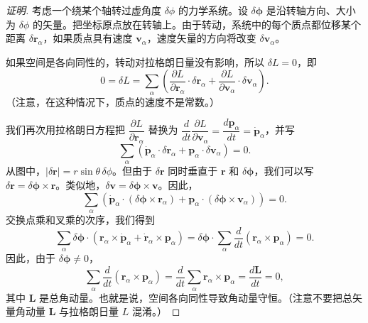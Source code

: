 \begin{proof}[证明]
考虑一个绕某个轴转过虚角度 $\delta\phi$ 的力学系统。设 $\delta\bm{\phi}$ 是沿转轴方向、大小为 $\delta\phi$ 的矢量。把坐标原点放在转轴上。由于转动，系统中的每个质点都位移某个距离 $\delta\mathbf{r}_\alpha$，如果质点具有速度 $\mathbf{v}_\alpha$，速度矢量的方向将改变 $\delta\mathbf{v}_\alpha$。

如果空间是各向同性的，转动对拉格朗日量没有影响，所以 $\delta L = 0$，即
\begin{equation}\label{eq:1.dL2}
0 = \delta L = \sum_{\alpha}\left(\frac{\partial L}{\partial \mathbf{r}_\alpha}\cdot\delta\mathbf{r}_\alpha + \frac{\partial L}{\partial \mathbf{v}_\alpha}\cdot\delta\mathbf{v}_\alpha\right).
\end{equation}
（注意，在这种情况下，质点的速度不是常数。）

我们再次用拉格朗日方程把 $\dfrac{\partial L}{\partial \mathbf{r}_\alpha}$ 替换为 $\dfrac{d}{dt}\dfrac{\partial L}{\partial \mathbf{v}_\alpha} = \dfrac{d\mathbf{p}_\alpha}{dt} = \dot{\mathbf{p}}_\alpha$，并写
\begin{equation}\label{eq:1.ang1}
\sum_{\alpha}\left(\dot{\mathbf{p}}_\alpha\cdot\delta\mathbf{r}_\alpha + \mathbf{p}_\alpha\cdot\delta\mathbf{v}_\alpha\right) = 0.
\end{equation}
从图中，$|\delta\mathbf{r}| = r\sin\theta\,\delta\phi$。但由于 $\delta\mathbf{r}$ 同时垂直于 $\mathbf{r}$ 和 $\delta\bm{\phi}$，我们可以写 $\delta\mathbf{r} = \delta\bm{\phi}\times\mathbf{r}$。类似地，$\delta\mathbf{v} = \delta\bm{\phi}\times\mathbf{v}$。因此，
\begin{equation}\label{eq:1.ang2}
\sum_{\alpha}\left(\dot{\mathbf{p}}_\alpha\cdot(\delta\bm{\phi}\times\mathbf{r}_\alpha) + \mathbf{p}_\alpha\cdot(\delta\bm{\phi}\times\mathbf{v}_\alpha)\right) = 0.
\end{equation}
交换点乘和叉乘的次序，我们得到
\begin{equation}\label{eq:1.ang3}
\sum_{\alpha}\delta\bm{\phi}\cdot\left(\mathbf{r}_\alpha\times\dot{\mathbf{p}}_\alpha + \dot{\mathbf{r}}_\alpha\times\mathbf{p}_\alpha\right) = \delta\bm{\phi}\cdot\sum_{\alpha}\frac{d}{dt}\left(\mathbf{r}_\alpha\times\mathbf{p}_\alpha\right) = 0.
\end{equation}
因此，由于 $\delta\bm{\phi} \neq 0$，
\begin{equation}\label{eq:1.ang4}
\sum_{\alpha}\frac{d}{dt}(\mathbf{r}_\alpha\times\mathbf{p}_\alpha) = \frac{d}{dt}\sum_{\alpha}\mathbf{r}_\alpha\times\mathbf{p}_\alpha = \frac{d\mathbf{L}}{dt} = 0,
\end{equation}
其中 $\mathbf{L}$ 是总角动量。也就是说，空间各向同性导致角动量守恒。（注意不要把总矢量角动量 $\mathbf{L}$ 与拉格朗日量 $L$ 混淆。）
\end{proof}

